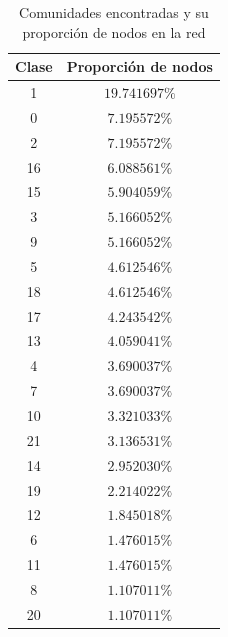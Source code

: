 \documentclass[10pt,a4paper,spanish]{article}
\numberwithin{equation}{section} %
\numberwithin{figure}{section} %
\numberwithin{table}{section} %
\begin{document}
\begin{table}[!h]
    \centering
    \begin{tabular}{c | c}
    Clase & Proporción de nodos \\
    \hline
    1   &  $19.741697\%$ \\
    0   &   $7.195572\%$ \\
    2   &   $7.195572\%$ \\
    16   &  $6.088561\%$ \\
    15   &  $5.904059\%$ \\
    3   &   $5.166052\%$ \\
    9   &   $5.166052\%$ \\
    5   &   $4.612546\%$ \\
    18   &  $4.612546\%$ \\
    17   &  $4.243542\%$ \\
    13   &  $4.059041\%$ \\
    4   &   $3.690037\%$ \\
    7   &   $3.690037\%$ \\
    10   &  $3.321033\%$ \\
    21   &  $3.136531\%$ \\
    14   &  $2.952030\%$ \\
    19   &  $2.214022\%$ \\
    12   &  $1.845018\%$ \\
    6   &   $1.476015\%$ \\
    11   &  $1.476015\%$ \\
    8   &   $1.107011\%$ \\
    20   &  $1.107011\%$ 
    \end{tabular}
    \caption{Comunidades encontradas y su proporción de nodos en la red}
    \label{comsn}
\end{table}
\end{document}

